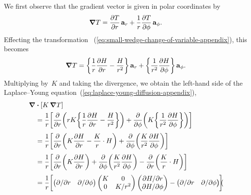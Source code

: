 We first observe that the gradient vector
is given in polar coordinates by
\begin{equation}
  \del T =
    \pder{T}{r} \basisvec{r} + \frac{1}{r} \pder{T}{\phi} \basisvec{\phi}.
  \label{eq:gradient-polar}
\end{equation}
Effecting the transformation~%
  (\ref{eq:small-wedge-change-of-variable-appendix}),
this becomes
\begin{equation}
  \del T =
    \curlybr*{\frac{1}{r} \pder{H}{r} - \frac{H}{r^2}} \basisvec{r}
      +
    \curlybr*{\frac{1}{r^2} \pder{H}{\phi}} \basisvec{\phi}.
  \label{eq:gradient-polar-change-of-variable}
\end{equation}
Multiplying by~$K$ and taking the divergence,
we obtain the left-hand side
of the Laplace--Young equation~(\ref{eq:laplace-young-diffusion-appendix}),
\begin{align*}
  \del & \dotp \squarebr{K \del T} \\
  &=
    \frac{1}{r} \squarebr*{
      \pder{}{r} \roundbr*{
        r K \curlybr*{\frac{1}{r} \pder{H}{r} - \frac{H}{r^2}}
      }
        +
      \pder{}{\phi} \roundbr*{
        K \curlybr*{\frac{1}{r^2} \pder{H}{\phi}}
      }
    }
    \\[\tallspace]
  &=
    \frac{1}{r} \squarebr*{
      \pder{}{r} \roundbr*{K \pder{H}{r} - \frac{K}{r} \cdot H}
        +
      \pder{}{\phi} \roundbr*{\frac{K}{r^2} \pder{H}{\phi}}
    }
    \\[\tallspace]
  &=
    \frac{1}{r} \squarebr*{
      \pder{}{r} \roundbr*{K \pder{H}{r}}
        +
      \pder{}{\phi} \roundbr*{\frac{K}{r^2} \pder{H}{\phi}}
        -
      \pder{}{r} \roundbr*{\frac{K}{r} \cdot H}
    }
    \\[\tallspace]
  &=
    \frac{1}{r} \squarebr*{
      \begin{pmatrix}
        \pd / {\pd r} & \pd / {\pd\phi}
      \end{pmatrix}
      \begin{pmatrix}
        K  &  0 \\
        0  &  K / r^2
      \end{pmatrix}
      \begin{pmatrix}
        \pd H / {\pd r} \\
        \pd H / {\pd\phi}
      \end{pmatrix}
        -
      \begin{pmatrix}
        \pd / {\pd r} & \pd / {\pd\phi}
      \end{pmatrix}
      \begin{pmatrix}

\end{pmatrix}}
\end{align*}
